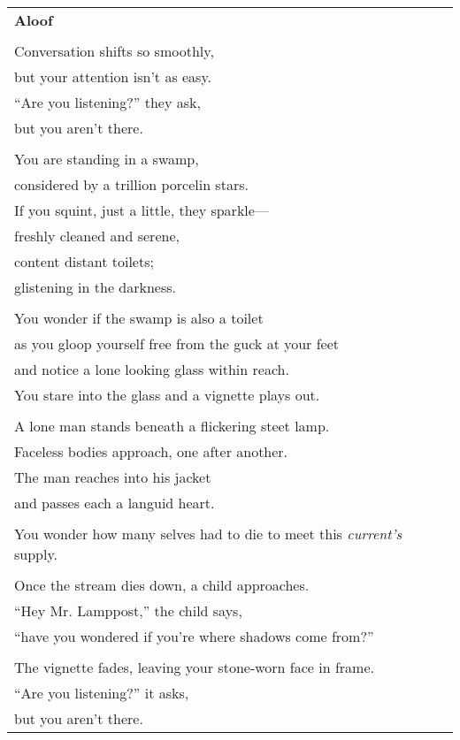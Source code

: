 \documentclass{article}
\begin{document}
\begin{center}
\begin{tabular}{l}
\textbf{Aloof} \\
\\
Conversation shifts so smoothly, \\
but your attention isn't as easy. \\
``Are you listening?'' they ask, \\
but you aren't there. \\
\\
You are standing in a swamp, \\
considered by a trillion porcelin stars. \\
If you squint, just a little, they sparkle--- \\
\hspace*{2ex}freshly cleaned and serene, \\
content distant toilets; \\
glistening in the darkness. \\
\\
You wonder if the swamp is also a toilet \\
as you gloop yourself free from the guck at your feet \\
and notice a lone looking glass within reach. \\
You stare into the glass and a vignette plays out. \\
\\
A lone man stands beneath a flickering steet lamp. \\
Faceless bodies approach, one after another. \\
The man reaches into his jacket \\
and passes each a languid heart. \\
\\
You wonder how many selves had to die to meet this \textit{current's}
	supply. \\
\\
Once the stream dies down, a child approaches. \\
``Hey Mr. Lamppost,'' the child says, \\
``have you wondered if you're where shadows come from?'' \\
\\
The vignette fades, leaving your stone-worn face in frame. \\
``Are you listening?'' it asks, \\
but you aren't there. \\

\end{tabular}
\end{center}
\end{document}
